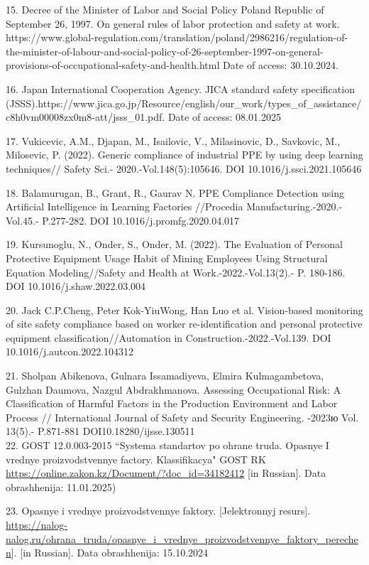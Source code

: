 {15. Decree of the Minister of Labor and Social Policy Poland Republic of
September 26, 1997. On general rules of labor protection and safety at
work.
https://www.global-regulation.com/translation/poland/2986216/regulation-of-the-minister-of-labour-and-social-policy-of-26-september-1997-on-general-provisions-of-occupational-safety-and-health.html
Date of access: 30.10.2024.

16. Japan International Cooperation Agency. JICA standard safety
specification
(JSSS).https://www.jica.go.jp/Resource/english/our\_work/types\_of\_assistance/c8h0vm00008zx0m8-att/jsss\_01.pdf.
Date of access: 08.01.2025

17. Vukicevic, A.M., Djapan, M., Isailovic, V., Milasinovic, D.,
Savkovic, M., Milosevic, P. (2022). Generic compliance of industrial PPE
by using deep learning techniques// Safety Sci.-
2020.-Vol.148(5):105646. DOI 10.1016/j.ssci.2021.105646

18. Balamurugan, B., Grant, R., Gaurav N. PPE Compliance Detection using
Artificial Intelligence in Learning Factories //Procedia
Manufacturing.-2020.- Vol.45.- P.277-282. DOI
10.1016/j.promfg.2020.04.017

19. Kursunoglu, N., Onder, S., Onder, M. (2022). The Evaluation of
Personal Protective Equipment Usage Habit of Mining Employees Using
Structural Equation Modeling//Safety and Health at
Work.-2022.-Vol.13(2).- P. 180-186. DOI 10.1016/j.shaw.2022.03.004

20. Jack C.P.Cheng, Peter Kok-YiuWong, Han Luo et al. Vision-based
monitoring of site safety compliance based on worker re-identification
and personal protective equipment classification//Automation in
Construction.-2022.-Vol.139. DOI 10.1016/j.autcon.2022.104312

21. Sholpan Abikenova, Gulnara Issamadiyeva, Elmira Kulmagambetova,
Gulzhan Daumova, Nazgul Abdrakhmanova. Assessing Occupational Risk: A
Classification of Harmful Factors in the Production Environment and
Labor Process // International Journal of Safety and Security
Engineering. -2023ю Vol. 13(5).- P.871-881 DOI10.18280/ijsse.130511\\
22. GOST 12.0.003-2015 ``Systema standartov po ohrane truda. Opasnye I
vrednye proizvodstvennye factory. Klassifikacya" GOST RK
\url{https://online.zakon.kz/Document/?doc_id=34182412} {[}in
Russian{]}. Data obrashhenija: 11.01.2025)

23. Opasnye i vrednye proizvodstvennye faktory. {[}Jelektronnyj
resurs{]}.
\url{https://nalog-nalog.ru/ohrana_truda/opasnye_i_vrednye_proizvodstvennye_faktory_perechen}{]}.
{[}in Russian{]}. Data obrashhenija: 15.10.2024

}
